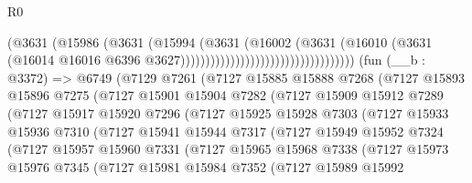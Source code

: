 \begin{lexlean}{R0}
\begin{coremodule}
                                                      (@3631
                                                        (@15986
                                                          (@3631
                                                            (@15994
                                                              (@3631
                                                                (@16002
                                                                  (@3631
                                                                    (@16010
                                                                      (@3631
                                                                        (@16014
                                                                          @16016
                                                                          @6396
                                                                          @3627)))))))))))))))))))))))))))))))))))
    (fun (__b : @3372) =>
    @6749
      (@7129
        @7261
        (@7127
          @15885
          @15888
          @7268
          (@7127
            @15893
            @15896
            @7275
            (@7127
              @15901
              @15904
              @7282
              (@7127
                @15909
                @15912
                @7289
                (@7127
                  @15917
                  @15920
                  @7296
                  (@7127
                    @15925
                    @15928
                    @7303
                    (@7127
                      @15933
                      @15936
                      @7310
                      (@7127
                        @15941
                        @15944
                        @7317
                        (@7127
                          @15949
                          @15952
                          @7324
                          (@7127
                            @15957
                            @15960
                            @7331
                            (@7127
                              @15965
                              @15968
                              @7338
                              (@7127
                                @15973
                                @15976
                                @7345
                                (@7127
                                  @15981
                                  @15984
                                  @7352
                                  (@7127
                                    @15989
                                    @15992

\end{coremodule}
\end{lexlean}
